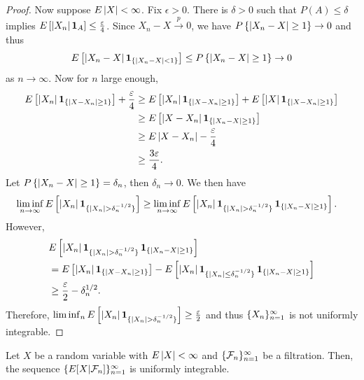 \documentclass[a4paper]{article}
\newcommand{\convp}{\xrightarrow{p}}
\begin{document}
\begin{proof}
  Now suppose $E \left\lvert X\right\rvert < \infty$. Fix $\epsilon > 0$. 
  There is $\delta > 0$ such that $P(A) \leq \delta$ implies
  $E \left[ \left\lvert X_n\right\rvert \operatorname{\mathbf{1}}_A \right] \leq \frac{\varepsilon}{4}$.
  Since $X_n - X \convp 0$, we have 
  $P \left\{ \left\lvert X_n - X\right\rvert \geq 1 \right\} \to 0$
  and thus
  \[
  E \left[ \left\lvert X_n - X\right\rvert \operatorname{\mathbf{1}}_{\{\left\lvert X_n - X\right\rvert < 1\}}\right]
  \leq P \left\{ \left\lvert X_n - X\right\rvert \geq 1 \right\} \to 0
  \]
  as $n \to \infty$.
  Now for $n$ large enough, 
  \begin{align*}
    E \left[ \left\lvert X_n\right\rvert \operatorname{\mathbf{1}}_{\{\left\lvert X - X_n\right\rvert \geq 1\}} \right] + \frac{\varepsilon}{4}
    &\geq E \left[ \left\lvert X_n\right\rvert \operatorname{\mathbf{1}}_{\{\left\lvert X - X_n\right\rvert \geq 1\}} \right]
    + E \left[ \left\lvert X\right\rvert \operatorname{\mathbf{1}}_{\{\left\lvert X - X_n\right\rvert \geq 1\}} \right] \\
    &\geq E \left[ \left\lvert X - X_n\right\rvert \operatorname{\mathbf{1}}_{\{\left\lvert X_n - X\right\rvert \geq 1\}} \right] \\
    &\geq E \left\lvert X - X_n\right\rvert - \frac{\varepsilon}{4} \\
    &\geq \frac{3 \varepsilon}{4}.
  \end{align*}
  Let $P \left\{ \left\lvert X_n - X\right\rvert \geq 1 \right\} = \delta_n$, then 
  $\delta_n \to 0$. We then have 
  \begin{align*}
    \liminf_{n \to \infty} E \left[ \left\lvert X_n\right\rvert 
    \operatorname{\mathbf{1}}_{\{\left\lvert X_n\right\rvert > \delta_n^{-1/2}\}} \right]
    &\geq \liminf_{n \to \infty} E \left[ \left\lvert X_n\right\rvert \operatorname{\mathbf{1}}_{\{\left\lvert X_n\right\rvert > \delta_n^{-1/2}\}}
    \operatorname{\mathbf{1}}_{\{\left\lvert X_n - X\right\rvert \geq 1\}} \right].
  \end{align*}
  However, 
  \begin{align*}
    & E \left[ \left\lvert X_n\right\rvert \operatorname{\mathbf{1}}_{\{\left\lvert X_n\right\rvert > \delta_n^{-1/2}\}}
    \operatorname{\mathbf{1}}_{\{\left\lvert X_n - X\right\rvert \geq 1\}} \right] \\
    &= E \left[ \left\lvert X_n\right\rvert \operatorname{\mathbf{1}}_{\{\left\lvert X - X_n\right\rvert \geq 1\}} \right]
    - E \left[ \left\lvert X_n\right\rvert \operatorname{\mathbf{1}}_{\{\left\lvert X_n\right\rvert \leq \delta_n^{-1/2}\}}
    \operatorname{\mathbf{1}}_{\{\left\lvert X_n - X\right\rvert \geq 1\}} \right] \\
    &\geq \frac{\varepsilon}{2} - \delta_n^{1/2}.
  \end{align*}
  Therefore, $\liminf_n E \left[ \left\lvert X_n\right\rvert \operatorname{\mathbf{1}}_{\{\left\lvert X_n\right\rvert 
  > \delta_n^{-1/2}\}} \right] \geq \frac{\varepsilon}{2}$ 
  and thus $\{ X_n \}_{n=1}^\infty$ is not uniformly integrable.

\end{proof}

\begin{thm}
  Let $X$ be a random variable with $E \left\lvert X\right\rvert < \infty$ and 
  $\{ \mathcal{F}_n \}_{n=1}^\infty$ be a filtration. Then, the sequence 
  $\{ E [X | \mathcal{F}_n] \}_{n=1}^\infty$ is uniformly integrable.
\end{thm}
\end{document}
